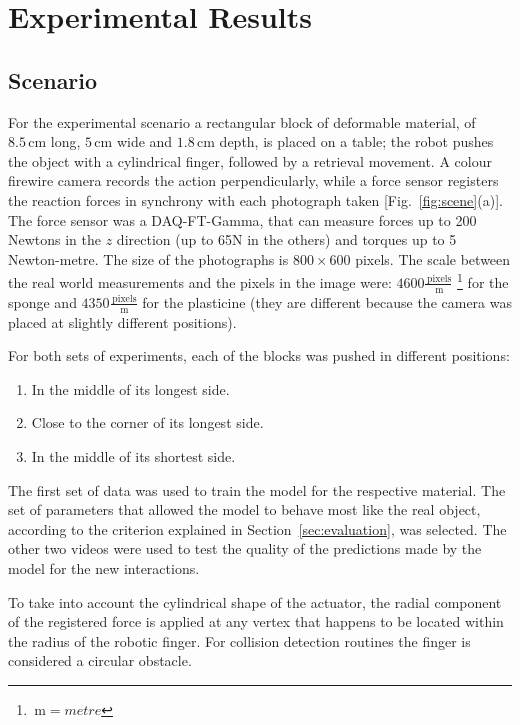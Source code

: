 \documentclass[journal]{IEEEtran}
\newcommand{\fref}[1]{Fig.~\ref{#1}}
\newcommand{\sref}[1]{Section~\ref{#1}}
\newcommand{\unit}[1]{\ensuremath{\, \mathrm{#1}}}
\begin{document}
\section{Experimental Results}
\label{sec:experiments}
\subsection{Scenario}
For the experimental scenario a rectangular block of deformable material, of $8.5 \unit{cm}$ long, $5 \unit{cm}$ wide and $1.8 \unit{cm}$ depth, is placed on a table; the robot pushes the object with a cylindrical finger, followed by a retrieval movement.  A colour firewire camera records the action perpendicularly, while a force sensor registers the reaction forces in synchrony with each photograph taken [\fref{fig:scene}(a)].  The force sensor was a DAQ-FT-Gamma, that can measure forces up to 200 Newtons in the $z$ direction (up to 65N in the others) and torques up to 5 Newton-metre.  The size of the photographs is $800 \times 600$ pixels.  The scale between the real world measurements and the pixels in the image were: $4600\frac{\unit{pixels}}{\unit{m}}$ \footnote{$\unit{m}=metre$} for the sponge and $4350\frac{\unit{pixels}}{\unit{m}}$ for the plasticine (they are different because the camera was placed at slightly different positions).

For both sets of experiments, each of the blocks was pushed in different positions:
\begin{enumerate}
 \item In the middle of its longest side.
 \item Close to the corner of its longest side.
 \item In the middle of its shortest side.
\end{enumerate}
The first set of data was used to train the model for the respective material.  The set of parameters that allowed the model to behave most like the real object, according to the criterion explained in \sref{sec:evaluation}, was selected.  The other two videos were used to test the quality of the predictions made by the model for the new interactions.

To take into account the cylindrical shape of the actuator, the radial component of the registered force is applied at any vertex that happens to be located within the radius of the robotic finger.  For collision detection routines the finger is considered a circular obstacle.
\end{document}
